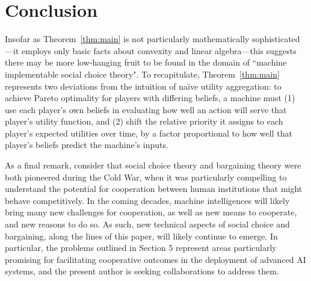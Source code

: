 \documentclass{article}  %
\newcommand{\thm}[1]{Theorem~\ref{thm:#1}}
\begin{document}
\section{Conclusion}

Insofar as \thm{main} is not particularly mathematically sophisticated---it employs only basic facts about convexity and linear algebra---this suggests there may be more low-hanging fruit to be found in the domain of ``machine implementable social choice theory".  To recapitulate, \thm{main} represents two deviations from the intuition of na\"{i}ve utility aggregation: to achieve Pareto optimality for players with differing beliefs, a machine must (1) use each player's own beliefs in evaluating how well an action will serve that player's utility function, and (2) shift the relative priority it assigns to each player's expected utilities over time, by a factor proportional to how well that player's beliefs predict the machine's inputs.

As a final remark, consider that social choice theory and bargaining theory were both pioneered during the Cold War, when it was particularly compelling to understand the potential for cooperation between human institutions that might behave competitively.  In the coming decades, machine intelligences will likely bring many new challenges for cooperation, as well as new means to cooperate, and new reasons to do so.  As such, new technical aspects of social choice and bargaining, along the lines of this paper, will likely continue to emerge.  In particular, the problems outlined in Section 5 represent areas particularly promising for facilitating cooperative outcomes in the deployment of advanced AI systems, and the present author is seeking collaborations to address them.





\end{document}
